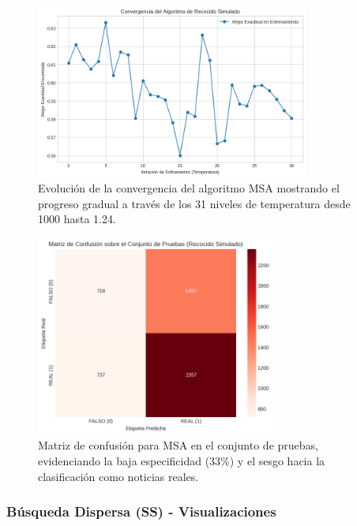 \begin{figure}[h!]
    \centering
    \includegraphics[width=0.8\textwidth]{Imagenes/convergencia_recocido_simulado.png}
    \caption{Evolución de la convergencia del algoritmo MSA mostrando el progreso gradual a través de los 31 niveles de temperatura desde 1000 hasta 1.24.}
    \label{fig:convergencia_msa}
\end{figure}

\begin{figure}[h!]
    \centering
    \includegraphics[width=0.7\textwidth]{Imagenes/matriz_confusion_recocido_simulado.png}
    \caption{Matriz de confusión para MSA en el conjunto de pruebas, evidenciando la baja especificidad (33\%) y el sesgo hacia la clasificación como noticias reales.}
    \label{fig:matriz_msa}
\end{figure}

\newpage

\subsubsection{Búsqueda Dispersa (SS) - Visualizaciones}

